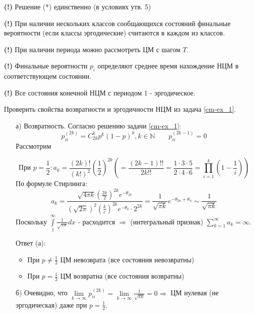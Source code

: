 \textbf{(!)} Решение (*) единственно (в условиях утв. 5)

\textbf{(!)} При наличии нескольких классов сообщающихся состояний финальные вероятности (если классы эргодические) считаются в каждом из классов.

\textbf{(!)} При наличии периода можно рассмотреть ЦМ с шагом $T$.

\textbf{(!)} Финальные вероятности $p_i$ определяют среднее время нахождение НЦМ в соответствующем состоянии.

\textbf{(!)} Все состояния конечной НЦМ с периодом 1 - эргодическое.

\begin{exmp}
	Проверить свойства возвратности и эргодичности НЦМ из задача \ref{cm-ex_1}.
	\begin{enumerate}
		\item[а)] Возвратность. Согласно решению задачи \ref{cm-ex_1}:
		\[ p_{ii}^{(2k)} = C_{2k}^k p^{k} (1-p)^k, k \in \mathbb{N} ~~~~~~~~~ p_{ii}^{(2k-1)} = 0 \]
		Рассмотрим
		\begin{figure}[h]
		\end{figure}
		\[ \text{При } p = \frac{1}{2}: a_k = \frac{(2k)!}{(k!)^2} \left( \frac{1}{2} \right)^{2k} \left( = \frac{(2k-1)!!}{2k!!} = \frac{1 \cdot 3 \cdot 5}{2 \cdot 4 \cdot 6} = \prod_{i=1}^{k} \left( 1 - \frac{1}{i} \right) \right) \]
		По формуле Стирлинга:
		\[ a_k = \frac{ \sqrt{4 \pi k} \left( \frac{2k}{2} \right)^{2k} e^{-\theta_{2k}}}{(\sqrt{2 \pi})^2 \left( \frac{k}{e} \right)^{2k} e^{-\theta_k} \cdot 2^{2k}} = \frac{1}{\sqrt{\pi k}} e^{-\theta_{2n} + \theta_n} \sim \frac{1}{\sqrt{\pi k}} \]
		Поскольку $\int\limits_{1}^{\infty} \frac{1}{\sqrt{\pi x}} dx$ - расходится $\Rightarrow$ (интегральный признак) $\sum\limits_{k=1}^{\infty} a_k = \infty$.
		
		Ответ (а):
		\begin{itemize}
			\item При $p \ne \frac{1}{2}$ ЦМ невозврата (все состояния невозвратны)
			\item При $p = \frac{1}{2}$ ЦМ возвратна (все состояния возвратны)
		\end{itemize}
		\item[б)] Очевидно, что $\lim\limits_{k \to \infty} p_{ii}^{(2k)} = \lim\limits_{k \to \infty} \frac{1}{\sqrt{\pi k}} = 0 \Rightarrow$ ЦМ нулевая (не эргодическая) даже при $p = \frac{1}{2}$.
	\end{enumerate}
\end{exmp}

